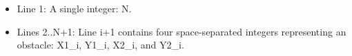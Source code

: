 \begin{itemize}
	\item      Line 1: A single integer: N.    
	\item      Lines 2..N+1: Line i+1 contains four space-separated integers         representing an obstacle: X1\_i, Y1\_i, X2\_i, and Y2\_i.    
\end{itemize}

\